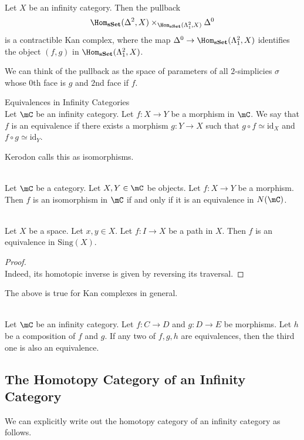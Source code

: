\documentclass[a4paper]{article}
\begin{document}
\begin{crl}{}{}\\ Let $X$ be an infinity category. Then the pullback $$\Hom_\bold{sSet}(\Delta^2,X)\times_{\Hom_\bold{sSet}(\Lambda_1^2,X)}\Delta^0$$ is a contractible Kan complex, where the map $\Delta^0\to\Hom_\bold{sSet}(\Lambda_1^2,X)$ identifies the object $(f,g)$ in $\Hom_\bold{sSet}(\Lambda_1^2,X)$. 
\end{crl}

We can think of the pullback as the space of parameters of all $2$-simplicies $\sigma$ whose $0$th face is $g$ and $2$nd face if $f$. 

\begin{defn}{Equivalences in Infinity Categories}{}\\ Let $\mC$ be an infinity category. Let $f:X\to Y$ be a morphism in $\mC$. We say that $f$ is an equivalence if there exists a morphism $g:Y\to X$ such that $g\circ f\simeq\text{id}_X$ and $f\circ g\simeq\text{id}_Y$. 
\end{defn}

Kerodon calls this as isomorphisms. 

\begin{eg}{}{}\\
Let $\mC$ be a category. Let $X,Y\in\mC$ be objects. Let $f:X\to Y$ be a morphism. Then $f$ is an isomorphism in $\mC$ if and only if it is an equivalence in $N(\mC)$. 
\end{eg}

\begin{eg}{}{}\\
Let $X$ be a space. Let $x,y\in X$. Let $f:I\to X$ be a path in $X$. Then $f$ is an equivalence in $\text{Sing}(X)$. 
\begin{proof}\\
Indeed, its homotopic inverse is given by reversing its traversal. 
\end{proof}
\end{eg}

The above is true for Kan complexes in general. 

\begin{prp}{}{}\\ Let $\mC$ be an infinity category. Let $f:C\to D$ and $g:D\to E$ be morphisms. Let $h$ be a composition of $f$ and $g$. If any two of $f,g,h$ are equivalences, then the third one is also an equivalence. 
\end{prp}

\subsection{The Homotopy Category of an Infinity Category}
We can explicitly write out the homotopy category of an infinity category as follows. 
\end{document}
